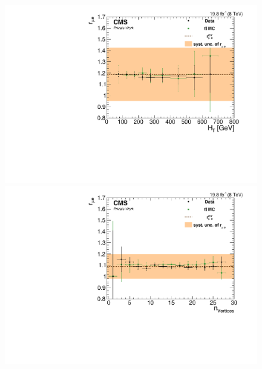 \begin{figure}[htbp]
\begin{minipage}[t]{0.49\textwidth}
\end{minipage}
\begin{minipage}[t]{0.49\textwidth}
\includegraphics[width=\textwidth]{plots/BG/rmue/8TeVrRatioDataVsMCControl_ht_Forward_Full2012.pdf}
\end{minipage}
\begin{minipage}[t]{0.49\textwidth}
  \includegraphics[width=\textwidth]{plots/BG/rmue/8TeVrRatioDataVsMCControl_nVertices_Central_Full2012.pdf}
\end{minipage}
\begin{minipage}[t]{0.49\textwidth}

\end{minipage}
\end{figure}
